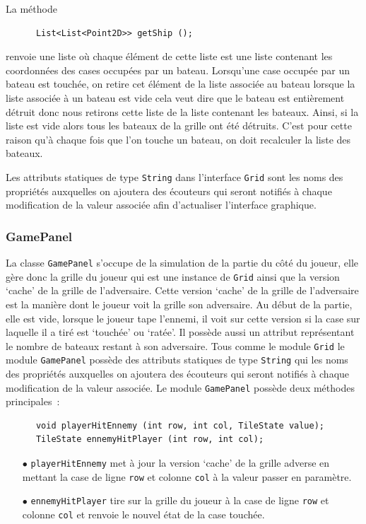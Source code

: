 \documentclass[12pt]{article}
\begin{document}
\bigskip

La méthode
\begin{verbatim}
      List<List<Point2D>> getShip ();
\end{verbatim}
renvoie une liste où chaque élément de cette liste
est une liste contenant les coordonnées des cases occupées par un bateau.
Lorsqu'une case occupée par un bateau est touchée, on retire cet élément de la
liste associée au bateau lorsque la liste associée à un bateau est vide cela
veut dire que le bateau est entièrement détruit donc nous retirons cette liste
de la liste contenant les bateaux. Ainsi, si la liste est vide alors tous les
bateaux de la grille ont été détruits. C'est pour cette raison qu'à chaque fois
que l'on touche un bateau, on doit recalculer la liste des bateaux.

\bigskip

Les attributs statiques de type \texttt{String} dans l'interface \texttt{Grid}
sont les noms des propriétés auxquelles on ajoutera des écouteurs qui seront
notifiés à chaque modification de la valeur associée afin d'actualiser
l'interface graphique.

\bigskip

\subsubsection{GamePanel}

La classe \texttt{GamePanel} s'occupe de la simulation de la partie du côté du
joueur, elle gère donc la grille du joueur qui est une instance de
\texttt{Grid} ainsi que la version `cache' de la grille de l'adversaire. Cette
version `cache' de la grille de l'adversaire est la manière dont le joueur voit
la grille son adversaire. Au début de la partie, elle est vide, lorsque le
joueur tape l'ennemi, il voit sur cette version si la case sur laquelle il a
tiré est `touchée' ou `ratée'. Il possède aussi un attribut représentant le
nombre de bateaux restant à son adversaire.
\bigskip
Tous comme le module \texttt{Grid} le module \texttt{GamePanel} possède des
attributs statiques de type \texttt{String} qui les noms des propriétés
auxquelles on ajoutera des écouteurs qui seront notifiés à chaque modification
de la valeur associée.
\bigskip
Le module \texttt{GamePanel} possède deux méthodes principales :
\begin{verbatim}
      void playerHitEnnemy (int row, int col, TileState value);
      TileState ennemyHitPlayer (int row, int col);
\end{verbatim}
\begin{itemize}
      \item[$\bullet$] \texttt{playerHitEnnemy} met à jour la version `cache'
            de la grille
            adverse en mettant la case de ligne \texttt{row} et colonne
            \texttt{col} à la valeur passer en paramètre.
            \bigskip
      \item[$\bullet$] \texttt{ennemyHitPlayer} tire sur la grille du joueur à
            la case de
            ligne \texttt{row} et colonne \texttt{col} et renvoie le nouvel
            état de la case touchée.
\end{itemize}
\end{document}
